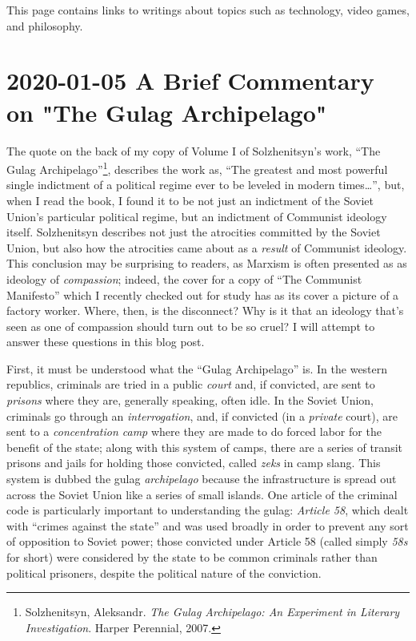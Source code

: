 \documentclass{article}
\begin{document}
This page contains links to writings about topics such as technology, video games, and philosophy.

\tableofchildlinks*

\section{2020-01-05 A Brief Commentary on "The Gulag Archipelago"}
The quote on the back of my copy of Volume I of Solzhenitsyn's work, ``The Gulag Archipelago''\footnote{Solzhenitsyn, Aleksandr. \textit{The Gulag Archipelago: An Experiment in Literary Investigation}.  Harper Perennial, 2007.}, describes the work as, ``The greatest and most powerful single indictment of a political regime ever to be leveled in modern times\ldots'', but, when I read the book, I found it to be not just an indictment of the Soviet Union's particular political regime, but an indictment of Communist ideology itself.  Solzhenitsyn describes not just the atrocities committed by the Soviet Union, but also how the atrocities came about as a \emph{result} of Communist ideology.  This conclusion may be surprising to readers, as Marxism is often presented as as ideology of \emph{compassion}; indeed, the cover for a copy of ``The Communist Manifesto'' which I recently checked out for study has as its cover a picture of a  factory worker.  Where, then, is the disconnect?  Why is it that an ideology that's seen as one of compassion should turn out to be so cruel?  I will attempt to answer these questions in this blog post.

First, it must be understood what the ``Gulag Archipelago'' is.  In the western republics, criminals are tried in a public \emph{court} and, if convicted, are sent to \emph{prisons} where they are, generally speaking, often idle.  In the Soviet Union, criminals go through an \emph{interrogation}, and, if convicted (in a \emph{private} court), are sent to a \emph{concentration camp} where they are made to do forced labor for the benefit of the state; along with this system of camps, there are a series of transit prisons and jails for holding those convicted, called \emph{zeks} in camp slang.  This system is dubbed the gulag \emph{archipelago} because the infrastructure is spread out across the Soviet Union like a series of small islands.  One article of the criminal code is particularly important to understanding the gulag: \emph{Article 58}, which dealt with ``crimes against the state'' and was used broadly in order to prevent any sort of opposition to Soviet power; those convicted under Article 58 (called simply \emph{58s} for short) were considered by the state to be common criminals rather than political prisoners, despite the political nature of the conviction.
\end{document}

